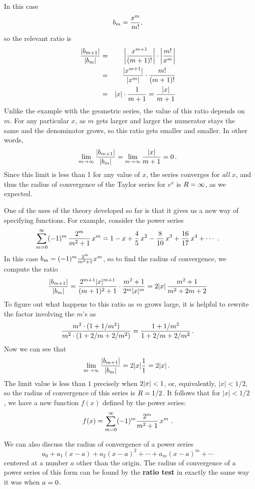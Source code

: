 {{{{In this case
\[
b_m={\displaystyle {x^m \over m!}},
\]
so the relevant ratio is
\begin{eqnarray*}
{|b_{m+1}| \over |b_m|} & = & \left|{x^{m+1} \over (m+1)!}\right| \cdot \left|{m! \over x^m}\right| \\
                        & = & {|x^{m+1}| \over |x^m|} \cdot {m! \over (m+1)!} \\
                        & = & |x| \cdot {1 \over m+1} = {|x| \over m+1}
\end{eqnarray*}
Unlike the example with the geometric series, the value of this ratio depends on $m$.  For any particular $x$, as $m$ gets larger and larger the numerator stays the same and the denominator grows, so this ratio gets smaller and smaller.  In other words,
\[
\lim_{m \to \infty} {|b_{m+1}| \over |b_m|} = \lim_{m \to \infty} {|x| \over m+1} = 0 \, .
\]
Since this limit is less than 1 for any value of $x$, the series converges for {\em all\/} $x$, and thus the radius of convergence of the Taylor series for $e^x$ is $R= \infty \/$, as we expected.


        One of the uses of the theory developed so far
is that it gives us a new way of specifying functions.  For example,
consider the power series
\[
\sum_{m=0}^\infty (-1)^m\,{2^m\over m^2+1}\,x^m = 
        1 - x + {\displaystyle {4\over5}}\,x^2 - {\displaystyle {8\over10}}\,x^3
        + {\displaystyle {16\over17}}\,x^4 + \cdots \ .
\]
In this case $b_m=(-1)^m{2^m \over m^2+1}x^m$, so to find the radius of convergence, we compute the ratio
\[
{|b_{m+1}| \over |b_m|} = 
        {2^{m+1}|x|^{m+1} \over (m+1)^2 + 1} \cdot {m^2 + 1 \over 2^m |x|^m}  = 2|x| \, {m^2 + 1 \over m^2 + 2m + 2}
\]
To figure out what happens to this ratio as $m$ grows large, 
it is helpful to rewrite the factor involving the $m$'s as
\[
{m^2 \cdot (1 + 1/m^2) \over m^2 \cdot (1+2/m +2/m^2)}
= {1 + 1/m^2 \over 1 + 2/m + 2/m^2} \, .
\]
Now we can see that
\[
\lim_{m \to \infty} {|b_{m+1}| \over |b_m|} = 2 |x| {1 \over 1} = 2|x| \, .\
\]
The limit value is less than $1$ precisely when $2|x| < 1\/$, or, equivalently, $|x| < 1/2,$ so the radius of convergence of this series is $R=1/2\/$.
It follows that for $|x| < 1/2$, we have a new function $f(x)$ defined by the power series:
\[
        f(x) = \sum_{m=0}^\infty (-1)^m
                {\displaystyle {2^m\over m^2+1}}\,x^m\ .
\]


     We can also discuss the radius of convergence of a power series
\[
         a_0 + a_1 (x - a) + a_2 (x - a)^2 + \cdots 
                + a_m (x - a)^m + \cdots 
\]
centered at a number $a$ other than the origin.  The radius of
convergence of a power series of this form can be found by the {\bf
ratio test} in exactly the same way it was when $a = 0\/$.
\medskip




}}}}
